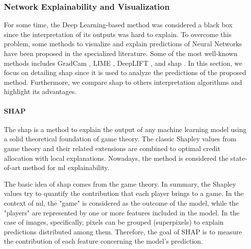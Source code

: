 



\subsubsection{Network Explainability and Visualization}

For some time, the Deep Learning-based method was considered a black box since the interpretation of its outputs was hard to explain. To overcome this problem, some methods to visualize and explain predictions of Neural Networks have been proposed in the specialized literature. Some of the most well-known methods includes GradCam \citep{gradcam}, LIME \citep{lime}, DeepLIFT \citep{deeplift_old, deeplift_new}, and \acs{shap} \citep{shap2018}. In this section, we focus on detailing \acs{shap} since it is used to analyze the predictions of the proposed method. Furthermore, we compare \acs{shap} to others interpretation algorithms and highlight its advantages.

\paragraph{SHAP}

The \acf{shap} is a method to explain the output of any machine learning model using a solid theoretical foundation of game theory. The classic Shapley values \citep{shapley1953value} from game theory and their related extensions are combined to optimal credit allocation with local explanations. Nowadays, the method is considered the state-of-art method for \acs{ml} explainability.

The basic idea of \acs{shap} comes from the game theory. In summary, the Shapley values try to quantify the contribution that each player brings to a game. In the context of \acl{ml}, the "game" is considered as the outcome of the model, while the "players" are represented by one or more features included in the model. In the case of images, specifically, pixels can be grouped (superpixels) to explain predictions distributed among them. Therefore, the goal of SHAP is to measure the contribution of each feature concerning the model's prediction.

